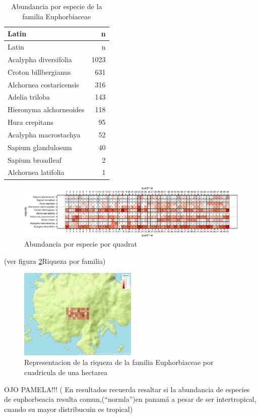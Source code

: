 \documentclass[11pt,]{article}
\begin{document}
\begin{longtable}[]{@{}lr@{}}
\caption{\label{tab:tabla_de_abundancia}Abundancia por especie de la
familia Euphorbiaceae}\tabularnewline
\toprule
Latin & n\tabularnewline
\midrule
\endfirsthead
\toprule
Latin & n\tabularnewline
\midrule
\endhead
Acalypha diversifolia & 1023\tabularnewline
Croton billbergianus & 631\tabularnewline
Alchornea costaricensis & 316\tabularnewline
Adelia triloba & 143\tabularnewline
Hieronyma alchorneoides & 118\tabularnewline
Hura crepitans & 95\tabularnewline
Acalypha macrostachya & 52\tabularnewline
Sapium glandulosum & 40\tabularnewline
Sapium broadleaf & 2\tabularnewline
Alchornea latifolia & 1\tabularnewline
\bottomrule
\end{longtable}

\begin{figure}
\centering
\includegraphics{manuscrito_files/figure-latex/unnamed-chunk-3-1.pdf}
\caption{\label{fig:abun_sp_q}Abundancia por especie por quadrat}
\end{figure}

(ver figura \ref{fig:cuadro_de_riqueza_familia}Riqueza por familia)

\begin{figure}
\centering
\includegraphics[width=0.50000\textwidth]{mapa_cuadros_riq_mi_familia.png}
\caption{\label{fig:cuadro_de_riqueza_familia}Representacion de la
riqueza de la familia Euphorbiaceae por cuadricula de una hectarea}
\end{figure}

OJO PAMELA!!! ( En resultados recuerda resaltar si la abundancia de
especies de euphorbeacia resulta comun,(``normla'')en panamá a pesar de
ser intertropical, cuando su mayor distribucuin es tropical)
\end{document}
